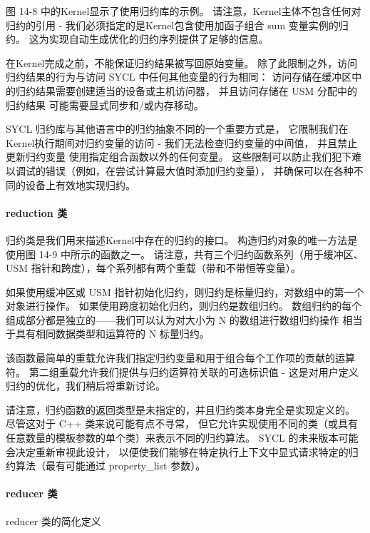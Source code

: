 图 14-8 中的Kernel显示了使用归约库的示例。 
请注意，Kernel主体不包含任何对归约的引用 - 我们必须指定的是Kernel包含使用加函子组合 sum 变量实例的归约。 
这为实现自动生成优化的归约序列提供了足够的信息。

在Kernel完成之前，不能保证归约结果被写回原始变量。 
除了此限制之外，访问归约结果的行为与访问 SYCL 中任何其他变量的行为相同：
访问存储在缓冲区中的归约结果需要创建适当的设备或主机访问器，
并且访问存储在 USM 分配中的归约结果 可能需要显式同步和/或内存移动。

SYCL 归约库与其他语言中的归约抽象不同的一个重要方式是，
它限制我们在Kernel执行期间对归约变量的访问 - 我们无法检查归约变量的中间值，
并且禁止更新归约变量 使用指定组合函数以外的任何变量。 
这些限制可以防止我们犯下难以调试的错误（例如，在尝试计算最大值时添加归约变量），
并确保可以在各种不同的设备上有效地实现归约。

\paragraph{reduction 类}

{\color{red}}

归约类是我们用来描述Kernel中存在的归约的接口。 构造归约对象的唯一方法是使用图 14-9 中所示的函数之一。 
请注意，共有三个归约函数系列（用于缓冲区、USM 指针和跨度），每个系列都有两个重载（带和不带恒等变量）。

如果使用缓冲区或 USM 指针初始化归约，则归约是标量归约，对数组中的第一个对象进行操作。 
如果使用跨度初始化归约，则归约是数组归约。 
数组归约的每个组成部分都是独立的——我们可以认为对大小为 N 的数组进行数组归约操作
相当于具有相同数据类型和运算符的 N 标量归约。

该函数最简单的重载允许我们指定归约变量和用于组合每个工作项的贡献的运算符。 
第二组重载允许我们提供与归约运算符关联的可选标识值 - 这是对用户定义归约的优化，我们稍后将重新讨论。

请注意，归约函数的返回类型是未指定的，并且归约类本身完全是实现定义的。 
尽管这对于 C++ 类来说可能有点不寻常，
但它允许实现使用不同的类（或具有任意数量的模板参数的单个类）来表示不同的归约算法。 
SYCL 的未来版本可能会决定重新审视此设计，
以便使我们能够在特定执行上下文中显式请求特定的归约算法（最有可能通过 property\_list 参数）。

\paragraph{reducer 类}

{\color{red} reducer 类的简化定义}

